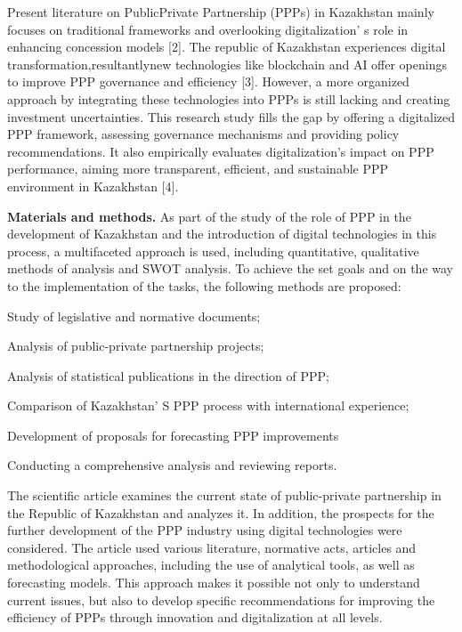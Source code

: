 \begin{multicols}{2}
Present literature on PublicPrivate Partnership (PPPs) in Kazakhstan
mainly focuses on traditional frameworks and overlooking
digitalization' s role in enhancing concession models
{[}2{]}. The republic of Kazakhstan experiences digital
transformation,resultantlynew technologies like blockchain and AI offer
openings to improve PPP governance and efficiency {[}3{]}. However, a
more organized approach by integrating these technologies into PPPs is
still lacking and creating investment uncertainties. This research study
fills the gap by offering a digitalized PPP framework, assessing
governance mechanisms and providing policy recommendations. It also
empirically evaluates digitalization's impact on PPP performance, aiming
more transparent, efficient, and sustainable PPP environment in
Kazakhstan {[}4{]}.

{\bfseries Materials and methods.} As part of the study of the role of PPP
in the development of Kazakhstan and the introduction of digital
technologies in this process, a multifaceted approach is used, including
quantitative, qualitative methods of analysis and SWOT analysis. To
achieve the set goals and on the way to the implementation of the tasks,
the following methods are proposed:

Study of legislative and normative documents;

Analysis of public-private partnership projects;

Analysis of statistical publications in the direction of PPP;

Comparison of Kazakhstan' S PPP process with
international experience;

Development of proposals for forecasting PPP improvements

Conducting a comprehensive analysis and reviewing reports.

The scientific article examines the current state of public-private
partnership in the Republic of Kazakhstan and analyzes it. In addition,
the prospects for the further development of the PPP industry using
digital technologies were considered. The article used various
literature, normative acts, articles and methodological approaches,
including the use of analytical tools, as well as forecasting models.
This approach makes it possible not only to understand current issues,
but also to develop specific recommendations for improving the
efficiency of PPPs through innovation and digitalization at all levels.


\end{multicols}
